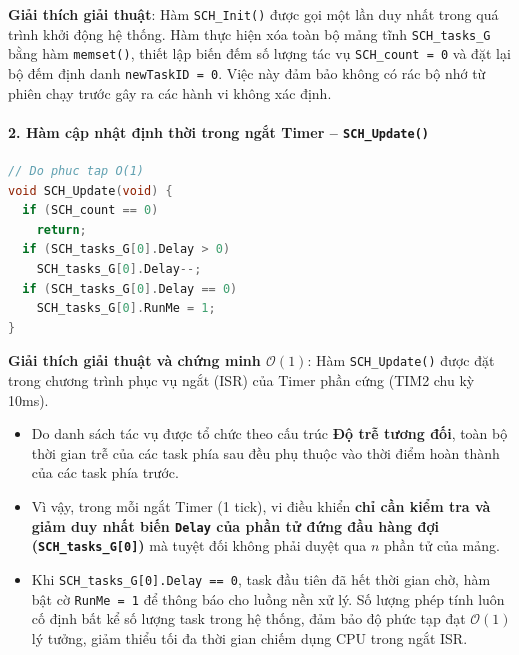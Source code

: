 \textbf{Giải thích giải thuật}:
Hàm \texttt{SCH\_Init()} được gọi một lần duy nhất trong quá trình khởi động hệ thống. Hàm thực hiện xóa toàn bộ mảng tĩnh \texttt{SCH\_tasks\_G} bằng hàm \texttt{memset()}, thiết lập biến đếm số lượng tác vụ \texttt{SCH\_count = 0} và đặt lại bộ đếm định danh \texttt{newTaskID = 0}. Việc này đảm bảo không có rác bộ nhớ từ phiên chạy trước gây ra các hành vi không xác định.

\paragraph{2. Hàm cập nhật định thời trong ngắt Timer -- \texttt{SCH\_Update()}}
\begin{lstlisting}[language=C, caption={Mã nguồn hàm SCH\_Update}]
// Do phuc tap O(1)
void SCH_Update(void) {
  if (SCH_count == 0)
    return;
  if (SCH_tasks_G[0].Delay > 0)
    SCH_tasks_G[0].Delay--;
  if (SCH_tasks_G[0].Delay == 0)
    SCH_tasks_G[0].RunMe = 1;
}
\end{lstlisting}
\textbf{Giải thích giải thuật và chứng minh $\mathcal{O}(1)$}:
Hàm \texttt{SCH\_Update()} được đặt trong chương trình phục vụ ngắt (ISR) của Timer phần cứng (TIM2 chu kỳ 10ms).
\begin{itemize}
    \item Do danh sách tác vụ được tổ chức theo cấu trúc \textbf{Độ trễ tương đối}, toàn bộ thời gian trễ của các task phía sau đều phụ thuộc vào thời điểm hoàn thành của các task phía trước.
    \item Vì vậy, trong mỗi ngắt Timer (1 tick), vi điều khiển \textbf{chỉ cần kiểm tra và giảm duy nhất biến \texttt{Delay} của phần tử đứng đầu hàng đợi (\texttt{SCH\_tasks\_G[0]})} mà tuyệt đối không phải duyệt qua $n$ phần tử của mảng.
    \item Khi \texttt{SCH\_tasks\_G[0].Delay == 0}, task đầu tiên đã hết thời gian chờ, hàm bật cờ \texttt{RunMe = 1} để thông báo cho luồng nền xử lý. Số lượng phép tính luôn cố định bất kể số lượng task trong hệ thống, đảm bảo độ phức tạp đạt $\mathcal{O}(1)$ lý tưởng, giảm thiểu tối đa thời gian chiếm dụng CPU trong ngắt ISR.
\end{itemize}

